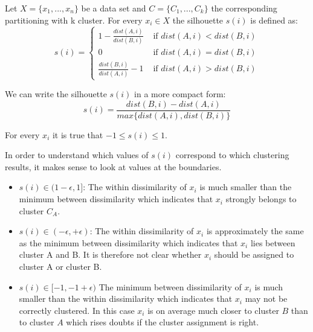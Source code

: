 \begin{definition}
Let $X=\{x_1, ..., x_n\}$ be a data set and $C=\{C_1, ..., C_k\}$ the corresponding partitioning with k cluster. For every $x_i \in X$ the silhouette $s(i)$ is defined as:
	\begin{equation*}\label{equ:silhouette_long}
	s(i) = \begin{cases}
		1-\frac{dist(A,i)}{dist(B,i)} 	& \text{ if } dist(A,i) < dist(B,i)\\
		0 					& \text{ if } dist(A,i) = dist(B,i)\\
		\frac{dist(B,i)}{dist(A,i)}-1 	& \text{ if } dist(A,i) > dist(B,i)
	\end{cases}
	\end{equation*}
\end{definition}

\begin{remark}
	We can write the silhouette $s(i)$ in a more compact form: 
	\begin{equation*}
		s(i) = \frac{dist(B,i) - dist(A,i)}{max\{ dist(A,i), dist(B,i) \}}
	\end{equation*}
\end{remark}

\begin{remark}
	For every $x_i$ it is true that $-1 \leq s(i) \leq 1$.
\end{remark}

\begin{remark}
	In order to understand which values of $s(i)$ correspond to which clustering results, it makes sense to look at values at the boundaries. 
	\begin{itemize}[label=$\star$]
		\item $s(i) \in (1 - \epsilon, 1]$: The within dissimilarity of $x_i$ is much smaller than the minimum between dissimilarity which indicates that $x_i$ strongly belongs to cluster $C_A$.
		\item $s(i) \in (-\epsilon, + \epsilon)$: The within dissimilarity of $x_i$ is approximately the same as the minimum between dissimilarity which indicates that $x_i$ lies between cluster A and B. It is therefore not clear whether $x_i$ should be assigned to cluster A or cluster B. 
		\item $s(i) \in [-1, -1 + \epsilon)$ The minimum between dissimilarity of $x_i$ is much smaller than the within dissimilarity which indicates that $x_i$ may not be correctly clustered. In this case $x_i$ is on average much closer to cluster $B$ than to cluster $A$ which rises doubts if the cluster assignment is right. 
	\end{itemize}
\end{remark}

